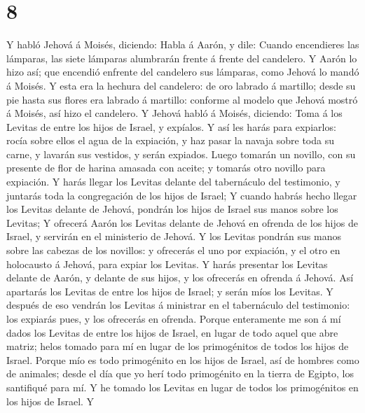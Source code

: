 \hypertarget{section-7}{%
\section{8}\label{section-7}}

 Y habló Jehová á Moisés, diciendo:  Habla á
Aarón, y dile: Cuando encendieres las lámparas, las siete lámparas
alumbrarán frente á frente del candelero.  Y Aarón lo hizo
así; que encendió enfrente del candelero sus lámparas, como Jehová lo
mandó á Moisés.  Y esta era la hechura del candelero: de oro
labrado á martillo; desde su pie hasta sus flores era labrado á
martillo: conforme al modelo que Jehová mostró á Moisés, así hizo el
candelero.  Y Jehová habló á Moisés, diciendo: 
Toma á los Levitas de entre los hijos de Israel, y expíalos.
 Y así les harás para expiarlos: rocía sobre ellos el agua
de la expiación, y haz pasar la navaja sobre toda su carne, y lavarán
sus vestidos, y serán expiados.  Luego tomarán un novillo,
con su presente de flor de harina amasada con aceite; y tomarás otro
novillo para expiación.  Y harás llegar los Levitas delante
del tabernáculo del testimonio, y juntarás toda la congregación de los
hijos de Israel;  Y cuando habrás hecho llegar los Levitas
delante de Jehová, pondrán los hijos de Israel sus manos sobre los
Levitas;  Y ofrecerá Aarón los Levitas delante de Jehová en
ofrenda de los hijos de Israel, y servirán en el ministerio de Jehová.
 Y los Levitas pondrán sus manos sobre las cabezas de los
novillos: y ofrecerás el uno por expiación, y el otro en holocausto á
Jehová, para expiar los Levitas.  Y harás presentar los
Levitas delante de Aarón, y delante de sus hijos, y los ofrecerás en
ofrenda á Jehová.  Así apartarás los Levitas de entre los
hijos de Israel; y serán míos los Levitas.  Y después de
eso vendrán los Levitas á ministrar en el tabernáculo del testimonio:
los expiarás pues, y los ofrecerás en ofrenda.  Porque
enteramente me son á mí dados los Levitas de entre los hijos de Israel,
en lugar de todo aquel que abre matriz; helos tomado para mí en lugar de
los primogénitos de todos los hijos de Israel.  Porque mío
es todo primogénito en los hijos de Israel, así de hombres como de
animales; desde el día que yo herí todo primogénito en la tierra de
Egipto, los santifiqué para mí.  Y he tomado los Levitas en
lugar de todos los primogénitos en los hijos de Israel.  Y

